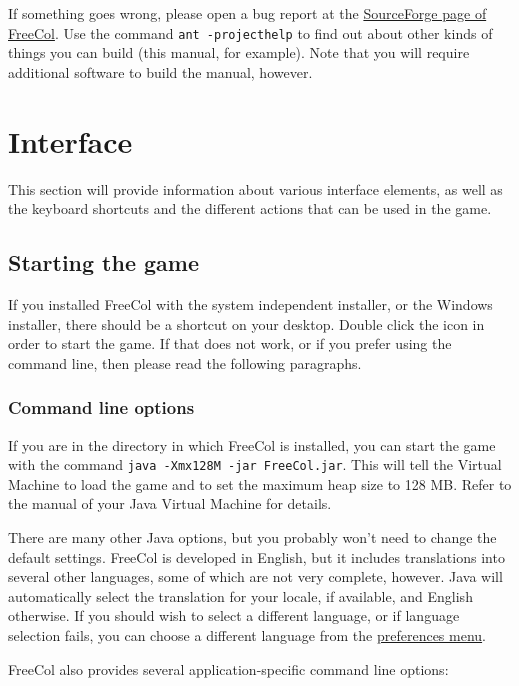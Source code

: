 \documentclass[12pt]{article}
\begin{document}
If something goes wrong, please open a bug report at the
\href{http://sourceforge.net/projects/freecol}{SourceForge page of
  FreeCol}. Use the command \verb$ant -projecthelp$ to find out
about other kinds of things you can build (this manual, for
example). Note that you will require additional software to build the
manual, however.


\hypertarget{Interface}{\section{Interface}}

This section will provide information about various interface
elements, as well as the keyboard shortcuts and the different actions
that can be used in the game.

\hypertarget{Starting the game}{\subsection{Starting the game}}

If you installed FreeCol with the system independent installer, or the
Windows installer, there should be a shortcut on your desktop. Double
click the icon in order to start the game. If that does not work, or
if you prefer using the command line, then please read the following
paragraphs.


\hypertarget{Command line options}{\subsubsection{Command line options}}

If you are in the directory in which FreeCol is installed, you can
start the game with the command \verb$java -Xmx128M -jar FreeCol.jar$.
This will tell the Virtual Machine to load the game and to set the
maximum heap size to 128 MB. Refer to the manual of your Java Virtual
Machine for details.

There are many other Java options, but you probably won't need to
change the default settings. FreeCol is developed in English, but it
includes translations into several other languages, some of which are
not very complete, however. Java will automatically select the
translation for your locale, if available, and English otherwise. If
you should wish to select a different language, or if language
selection fails, you can choose a different language from the
\hyperlink{Client options}{preferences menu}.

FreeCol also provides several application-specific command line
options:
\end{document}
